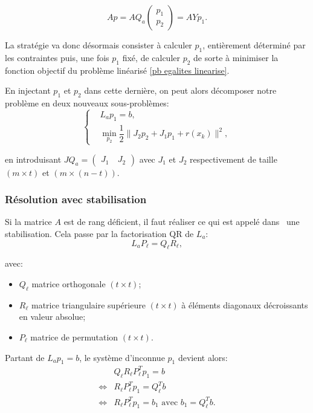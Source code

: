 $$
Ap = AQ_{a} \begin{pmatrix}
p_{1}\\p_{2}
\end{pmatrix}=AYp_{1}.
$$

La stratégie va donc désormais consister à calculer $p_{1}$, entièrement déterminé par les contraintes puis, une fois $p_{1}$ fixé, de calculer $p_{2}$ de sorte à minimiser 
la fonction objectif du problème linéarisé \eqref{pb egalites linearise}. 

En injectant $p_{1}$ et $p_{2}$ dans cette dernière, on peut alors décomposer notre problème en deux nouveaux sous-problèmes:
\[
\left\{
\begin{aligned}
&L_{a}p_{1} = b, \\
&\underset{p_{2}}{\min} \dfrac{1}{2}\|J_{2}p_{2} + J_{1}p_{1} + r(x_{k})\|^{2},
\end{aligned}\right.
\]

en introduisant $JQ_{a} = \begin{pmatrix}
J_{1}\ & J_{2}
\end{pmatrix}$ avec $J_{1}$ et $J_{2}$ respectivement de taille $(m\times t)$ et $(m\times (n-t))$.


\subsubsection{Résolution avec stabilisation} \label{resolutionavecstab}

Si la matrice $A$ est de rang déficient, il faut réaliser ce qui est appelé dans~\cite{lindwedin88} une stabilisation. Cela passe par la factorisation QR de $L_{a}$: 
\begin{equation} \label{qrL}
L_{a}P_{\ell} = Q_{\ell} R_{\ell},
\end{equation}

avec:
\begin{itemize}
\item
$Q_{\ell}$ matrice orthogonale $(t \times t)$;
\item
$R_{\ell}$ matrice triangulaire supérieure $(t \times t)$ à éléments diagonaux décroissants en valeur absolue; 
\item
$P_{\ell}$ matrice de permutation $(t \times t)$.
\end{itemize}

Partant de $L_{a}p_{1}=b$, le système d'inconnue $p_{1}$ devient alors:
$$ 
\begin{aligned}
&Q_{\ell}R_{\ell}P_{\ell}^{T}p_{1}=b\\
\Longleftrightarrow& R_{\ell}P_{\ell}^Tp_1 = Q_{\ell}^{T}b\\
\Longleftrightarrow& R_{\ell}P_{\ell}^Tp_1 = b_{1} \text{ avec } b_1 = Q_{\ell}^{T}b.
\end{aligned}
$$

